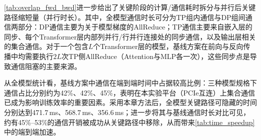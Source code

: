 \autoref{tab:overlap_fwd_bwd}进一步给出了关键阶段的计算/通信耗时拆分与并行后关键路径缩短量（并行时长）。其中，全模型通信时长可分为TP组内通信与DP组间通信两部分：DP通信主要为关于模型梯度的AllReduce；TP通信主要来自嵌入层的同步、每个Transformer层内部列并行/行并行连接处的同步通信，以及输出层相关的集合通信。对于一个包含$L$个Transformer层的模型，基线方案在前向与反向传播中均需要执行$2L$次TP侧AllReduce（Attention与MLP各一次），这些同步点是导致通信阻塞的主要来源。

从全模型统计看，基线方案中通信在端到端时间中占据较高比例：三种模型规格下通信占比分别约为42\%、42\%、45\%，表明在本实验平台（PCIe互连）上集合通信已成为影响训练效率的重要因素。采用本章方法后，全模型关键路径可隐藏的时间分别达到471.7\,ms、568.7\,ms、356.6\,ms；进一步将其与基线通信时长对比可见，约有45\%--53\%的通信开销被成功从关键路径中移除，从而带来\autoref{tab:time_speedup}中的端到端加速。

